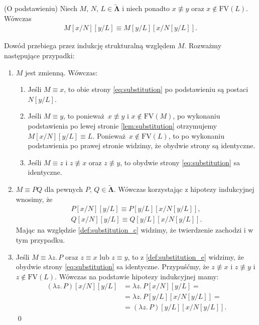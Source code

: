 \begin{lemat}(O podstawieniu)\label{lem:substitution}
  Niech \(M,\,N,\,L\in \mathbf{\tilde\Lambda}\) i niech ponadto \(x\not\equiv y\) oraz \(x\not\in\mathrm{FV}(L)\). Wówczas
  \begin{align}\label{eq:substitution}
    M[x/N][y/L]\equiv M[y/L]\left[x/N\left[y/L\right]\right].
  \end{align}
  \begin{dowod}
    Dowód przebiega przez indukcję strukturalną względem \(M\). Rozważmy następujące przypadki:
    \begin{enumerate}[label={\roman*)}, ref={(\arabic*)}]
      \item \(M\) jest zmienną. Wówczas:
        \begin{enumerate}[label={\alph*.}]
        \item Jeśli \(M\equiv x\), to obie strony \eqref{eq:substitution} po podstawieniu są postaci \(N[y/L]\).
        \item Jeśli \(M\equiv y\), to ponieważ \(x\not\equiv y\) i \(x\not\in\mathrm{FV}(M)\), po wykonaniu podstawienia po lewej stronie \eqref{lem:substitution} otrzymujemy \(M[x/N][y/L]\equiv L\). Ponieważ \(x\not\in\mathrm{FV}(L)\), to po wykonaniu podstawienia po prawej stronie widzimy, że obydwie strony są identyczne.

        \item Jeśli \(M\equiv z\) i \(z\not\equiv x\)  oraz \(z\not\equiv y\), to obydwie strony \eqref{eq:substitution} sa identyczne.
        \end{enumerate}

      \item \(M\equiv P Q\) dla pewnych \(P,\,Q\in\mathbf{\tilde\Lambda}\). Wówczas korzystając z hipotezy indukcyjnej wnosimy, że
        \begin{align*}
          P[x/N][y/L]\equiv P[y/L]\left[x/N\left[y/L\right]\right],\\
          Q[x/N][y/L]\equiv Q[y/L]\left[x/N\left[y/L\right]\right].
        \end{align*}
        Mając na względzie \ref{def:substitution_c} widzimy, że twierdzenie zachodzi i w tym przypadku.
        \item Jeśli \(M\equiv \lambda z.\,P\) oraz \(z\equiv x\) lub \(z\equiv y\), to z \ref{def:substitution_e} widzimy, że obydwie strony \eqref{eq:substitution} sa identyczne. Przypuśćmy, że \(z\not\equiv x\) i \(z\not\equiv y\) i \(z\not\in\mathrm{FV}(L)\). Wówczas na podstawie hipotezy indukcyjnej mamy:
      \begin{align*}
        (\lambda z.\,P)[x/N][y/L] &= \lambda z.\,P[x/N][y/L] =\\
                                  &= \lambda z.\,P[y/L][x/N[y/L]] =\\
                                  &= (\lambda z.\,P)[y/L][x/N[y/L]].
      \end{align*}
    \qed
    \end{enumerate}
  \end{dowod}
\end{lemat}

